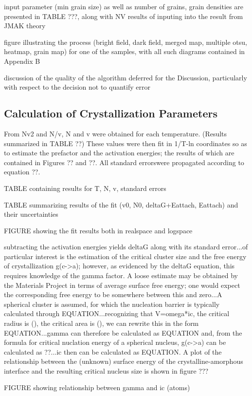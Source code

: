 input parameter (min grain size) as well as number of grains, grain densities are presented in TABLE ???, along with NV results of inputing into the result from JMAK theory

figure illustrating the process (bright field, dark field, merged map, multiple otsu, heatmap, grain map) for one of the samples, with all such diagrams contained in Appendix B

discussion of the quality of the algorithm deferred for the Discussion, particularly with respect to the decision not to quantify error

\subsection{Calculation of Crystallization Parameters}

From Nv2 and N/v, N and v were obtained for each temperature. (Results summarized in TABLE ??)
  These values were then fit in 1/T-ln coordinates so as to estimate the prefactor and the activation energies; the results of which are contained in Figures ?? and ??.  All standard errorswere propagated according to equation ??.

TABLE containing results for T, N, v, standard errors

TABLE summarizing results of the fit (v0, N0, deltaG+Eattach, Eattach) and their uncertainties

FIGURE showing the fit results both in realspace and logspace

subtracting the activation energies yields deltaG along with its standard error...of particular interest is the estimation of the critical cluster size and the free energy of crystallization g(c->a); however, as evidenced by the deltaG equation, this requires knowledge of the gamma factor.  A loose estimate may be obtained by the Materials Project in terms of average surface free energy; one would expect the corresponding free energy to be somewhere between this and zero...A spherical cluster is assumed, for which the nucleation barrier is typically calculated through EQUATION...recognizing that V=omega*ic, the critical radius is (), the critical area is (), we can rewrite this in the form EQUATION...gamma can therefore be calculated as EQUATION and, from the formula for critical nuclation energy of a spherical nucleus, g(c->a) can be calculated as ??...ic then can be calculated as EQUATION.  A plot of the relationship between the (unknown) surface energy of the crystalline-amorphous interface and the resulting critical nucleus size is shown in figure ???

FIGURE showing relationship between gamma and ic (atoms)
